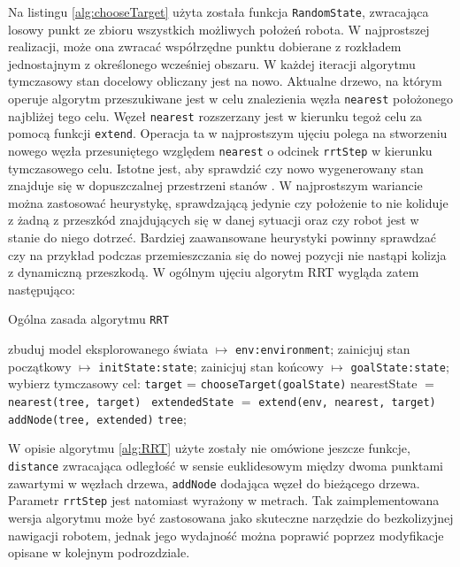 Na listingu \ref{alg:chooseTarget} użyta została funkcja \texttt{RandomState}, zwracająca losowy punkt ze zbioru wszystkich możliwych położeń robota.
W najprostszej realizacji, może ona zwracać współrzędne punktu dobierane z rozkładem jednostajnym z określonego wcześniej obszaru.
W każdej iteracji algorytmu tymczasowy stan docelowy obliczany jest na nowo. Aktualne drzewo, na którym operuje algorytm przeszukiwane jest w celu znalezienia
węzła \texttt{nearest} położonego najbliżej tego celu. Węzeł \texttt{nearest} rozszerzany jest w kierunku tegoż celu za pomocą funkcji \texttt{extend}.
Operacja ta w najprostszym ujęciu polega na stworzeniu nowego węzła przesuniętego względem \texttt{nearest} o odcinek \texttt{rrtStep} w kierunku tymczasowego celu.
Istotne jest, aby sprawdzić czy nowo wygenerowany stan znajduje się w dopuszczalnej przestrzeni stanów \textdollar. W najprostszym wariancie można zastosować
heurystykę, sprawdzającą jedynie czy położenie to nie koliduje z żadną z przeszkód znajdujących się w danej sytuacji oraz czy robot jest w stanie do niego dotrzeć.
Bardziej zaawansowane heurystyki powinny sprawdzać czy na przykład podczas przemieszczania  się do nowej pozycji nie nastąpi kolizja z dynamiczną przeszkodą.
W ogólnym ujęciu algorytm RRT wygląda zatem następująco:
  \begin{algorithm}[H]
	\caption{ Ogólna zasada algorytmu \texttt{RRT} }
	\label{alg:RRT}
	\begin{algorithmic}
	\STATE zbuduj model eksplorowanego świata $\mapsto$ \texttt{env:environment};
	\STATE zainicjuj stan początkowy $\mapsto$ \texttt{initState:state};
	\STATE zainicjuj stan końcowy $\mapsto$ \texttt{goalState:state};
	\STATE
	  \STATE wybierz tymczasowy cel: \texttt{target} =  \texttt{chooseTarget(goalState)}
	  \STATE nearestState $=$ \texttt{ nearest(tree, target) }
	  \STATE \texttt{extendedState} $=$ \texttt{extend(env, nearest, target)}
	    \STATE \texttt{addNode(tree, extended)}
	  \ENDIF
	\ENDWHILE
	\RETURN  \texttt{tree};
	\end{algorithmic}
  \end{algorithm}
W opisie algorytmu \ref{alg:RRT} użyte zostały nie omówione jeszcze funkcje, \texttt{distance} zwracająca odległość w sensie euklidesowym między dwoma punktami zawartymi w węzłach drzewa,
\texttt{addNode} dodająca węzeł do bieżącego drzewa. Parametr \texttt{rrtStep} jest natomiast wyrażony w metrach.
Tak zaimplementowana wersja algorytmu może być zastosowana jako skuteczne narzędzie do bezkolizyjnej nawigacji robotem, jednak jego wydajność można poprawić poprzez
modyfikacje opisane w kolejnym podrozdziale.

